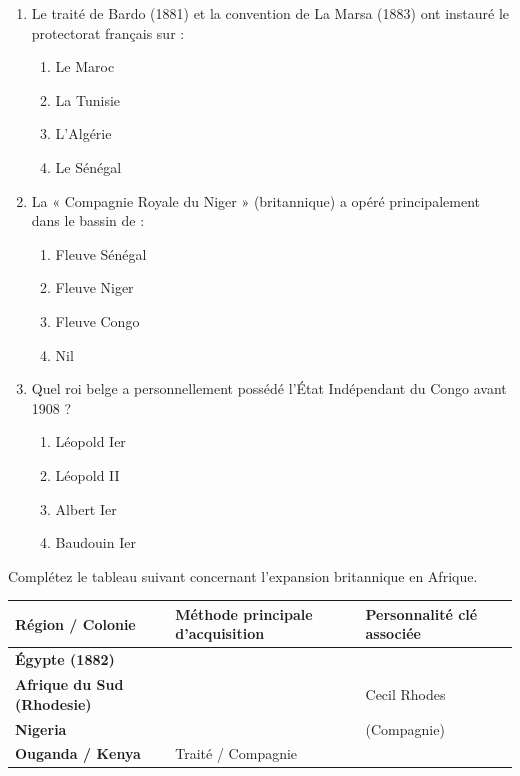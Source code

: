 \documentclass[11pt]{article}
\begin{document}
\begin{exercice}
\begin{enumerate}
    \item Le traité de Bardo (1881) et la convention de La Marsa (1883) ont instauré le protectorat français sur :
    \begin{enumerate}
        \item Le Maroc \item La Tunisie \item L'Algérie \item Le Sénégal
    \end{enumerate}
    \item La « Compagnie Royale du Niger » (britannique) a opéré principalement dans le bassin de :
    \begin{enumerate}
        \item Fleuve Sénégal \item Fleuve Niger \item Fleuve Congo \item Nil
    \end{enumerate}
    \item Quel roi belge a personnellement possédé l'État Indépendant du Congo avant 1908 ?
    \begin{enumerate}
        \item Léopold Ier \item Léopold II \item Albert Ier \item Baudouin Ier
    \end{enumerate}
\end{enumerate}
\end{exercice}

\begin{exercice}
Complétez le tableau suivant concernant l'expansion britannique en Afrique.

\begin{tabularx}{\linewidth}{@{} >{\bfseries}l X X @{}}
\toprule
Région / Colonie & Méthode principale d'acquisition & Personnalité clé associée \\
\midrule
Égypte (1882) & \dotfill & \dotfill \\
Afrique du Sud (Rhodesie) & \dotfill & Cecil Rhodes \\
Nigeria & \dotfill & \dotfill (Compagnie) \\
Ouganda / Kenya & Traité / Compagnie & \dotfill \\
\bottomrule
\end{tabularx}
\end{exercice}
\end{document}

